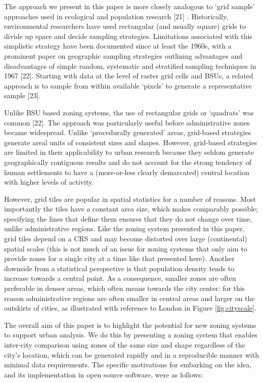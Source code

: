 \documentclass{josis}
\begin{document}
The approach we present in this paper is more closely analogous to `grid sample' approaches used in ecological and population research {[}21{]} . Historically, environmental researchers have used rectangular (and usually square) grids to divide up space and decide sampling strategies. Limitations associated with this simplistic strategy have been documented since at least the 1960s, with a prominent paper on geographic sampling strategies outlining advantages and disadvantages of simple random, systematic and stratified sampling techniques in 1967 {[}22{]}. Starting with data at the level of raster grid cells and BSUs, a related approach is to sample from within available `pixels' to generate a representative sample {[}23{]}.

Unlike BSU based zoning systems, the use of rectangular grids or `quadrats' was common {[}22{]}.
The approach was particularly useful before administrative zones became widespread.
Unlike `procedurally generated' areas, grid-based strategies generate areal units of consistent sizes and shapes.
However, grid-based strategies are limited in their applicability to urban research because they seldom generate geographically contiguous results and do not account for the strong tendency of human settlements to have a (more-or-less clearly demarcated) central location with higher levels of activity.

However, grid tiles are popular in spatial statistics for a number of reasons.
Most importantly the tiles have a constant area size, which makes comparably possible; specifying the lines that define them ensures that they do not change over time, unlike administrative regions.
Like the zoning system presented in this paper, grid tiles depend on a CRS and may become distorted over large (continental) spatial scales (this is not much of an issue for zoning systems that only aim to provide zones for a single city at a time like that presented here).
Another downside from a statistical perspective is that population density tends to increase towards a central point.
As a consequence, smaller zones are often preferable in denser areas, which often means towards the city center: for this reason administrative regions are often smaller in central areas and larger on the outskirts of cities, as illustrated with reference to London in Figure \ref{fig:cityscale}.

The overall aim of this paper is to highlight the potential for new zoning systems to support urban analysis.
We do this by presenting a zoning system that enables inter-city comparison using zones of the same size and shape regardless of the city's location, which can be generated rapidly and in a reproducible manner with minimal data requirements.
The specific motivations for embarking on the idea, and its implementation in open source software, were as follows:
\end{document}
